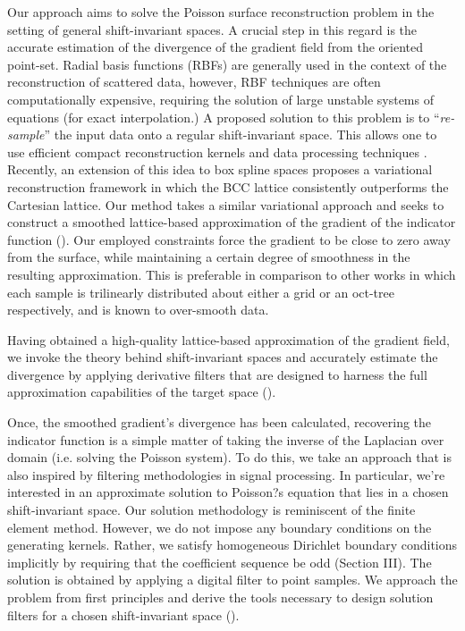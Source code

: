 Our approach aims to solve the Poisson surface reconstruction problem in the setting of general shift-invariant spaces. A crucial step in this regard is the accurate estimation of the divergence of the gradient field from the oriented point-set. Radial basis functions (RBFs) are generally used in the context of the reconstruction of scattered data, however, RBF techniques are often computationally expensive, requiring the solution of large unstable systems of equations (for exact interpolation.) A proposed solution to this problem is to ``\emph{re-sample}'' the input data onto a regular shift-invariant space. This allows one to use efficient compact reconstruction kernels and data processing techniques \cite{variational,onvari}. Recently, an extension of this idea to box spline spaces \cite{xu2012rec} proposes a variational reconstruction framework in which the BCC lattice consistently outperforms the Cartesian lattice. Our method takes a similar variational approach and seeks to construct a smoothed lattice-based approximation of the gradient of the indicator function (). Our employed constraints force the gradient to be close to zero away from the surface, while maintaining a certain degree of smoothness in the resulting approximation. This is preferable in comparison to other works \cite{fftk,Kazhdan06,screenedk} in which each sample is trilinearly distributed about either a grid or an oct-tree respectively, and is known to over-smooth data. 

Having obtained a high-quality lattice-based approximation of the gradient field, we invoke the theory behind shift-invariant spaces and accurately estimate the divergence by applying derivative filters that are designed to harness the full approximation capabilities of the target space (). 

Once, the smoothed gradient's divergence has been calculated, recovering the indicator function is a simple matter of taking the inverse of the Laplacian over domain (i.e. solving the Poisson system). To do this, we take an approach that is also inspired by filtering methodologies in signal processing. In particular, we're interested in an approximate solution to Poisson?s equation that lies in a chosen shift-invariant space. Our solution methodology is reminiscent of the finite element method. However, we do not impose any boundary conditions on the generating kernels. Rather, we satisfy homogeneous Dirichlet boundary conditions implicitly by requiring that the coefficient sequence be odd (Section III). The solution is obtained by applying a digital filter to point samples. We approach the problem from first principles and derive the tools necessary to design solution filters for a chosen shift-invariant space ().